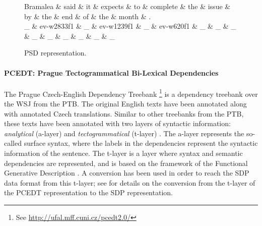 \begin{figure}
    \centering
    \smaller[]
    \begin{dependency}[]
        \begin{deptext}[column sep=0.2em, row sep=.1ex]
            Bramalea \& said \& it \& expects \& to \& complete \& the \& issue \& by \& the \& end \& of \& the \& month \& . \\
            \_ \& ev-w2833f1 \& \_ \& ev-w1239f1 \& \_ \& ev-w620f1 \& \_ \& \_ \& \_ \& \_ \& \_ \& \_ \& \_ \& \_ \& \_ \\
        \end{deptext}
    \end{dependency}
    \caption{PSD representation.}
    \label{PSD}
\end{figure}

\begin{displayquote}

\end{displayquote}

\paragraph{PCEDT: Prague Tectogrammatical Bi-Lexical Dependencies} The Prague Czech-English Dependency Treebank \cite{PCEDT}\footnote{See \url{http://ufal.mff.cuni.cz/pcedt2.0/}} is a dependency treebank over the WSJ from the PTB. The original English texts have been annotated along with annotated Czech translations. Similar to other treebanks from the PTB, these texts have been annotated with two layers of syntactic information: \textit{analytical} (a-layer) and \textit{tectogrammatical} (t-layer) \cite{Oepen:14}. The a-layer represents the so-called surface syntax, where the labels in the dependencies represent the syntactic information of the sentence. The t-layer is a layer where syntax and semantic dependencies are represented, and is based on the framework of the Functional Generative Description \cite{Sgall:86}. A conversion has been used in order to reach the SDP data format from this t-layer; see  for details on the conversion from the t-layer of the PCEDT representation to the SDP representation.

